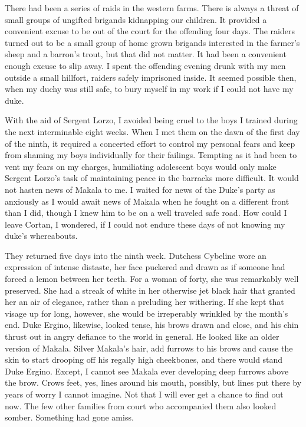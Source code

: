 \documentclass{article}
\begin{document}
There had been a series of raids in the western farms. There is always a threat of small groups of ungifted brigands kidnapping  our children. It provided a convenient excuse to be out of the court for the offending four days. The raiders turned out to be a small group of home grown brigands interested in the farmer's sheep and a barron's trout, but that did not matter. It had been a convenient enough excuse to slip away. I spent the offending evening drunk with my men outside a small hillfort, raiders safely imprisoned inside. It seemed possible then, when my duchy was still safe, to bury myself in my work if I could not have my duke. 

With the aid of Sergent Lorzo, I avoided being cruel to the boys I trained during the next interminable eight weeks. When I met them on the dawn of the first day of the ninth, it required a concerted effort to control my personal fears and keep from shaming my boys individually for their failings. Tempting as it had been to vent my fears on my charges, humiliating adolescent boys would only make Sergent Lorzo's task of maintaining peace in the barracks more difficult. It would not hasten news of Makala to me. I waited for news of the Duke's party as anxiously as I would await news of Makala when he fought on a different front than I did, though I knew him to be on a well traveled safe road. How could I leave Cortan, I wondered, if I could not endure these days of not knowing my duke's whereabouts.

They returned five days into the ninth week. Dutchess Cybeline wore an expression of intense distaste, her face puckered and drawn as if someone had forced a lemon between her teeth. For a woman of forty, she was remarkably well preserved. She had a streak of white in her otherwise jet black hair that granted her an air of elegance, rather than a preluding her withering. If she kept that visage up for long, however, she would be irreperably wrinkled by the month's end. Duke Ergino, likewise, looked tense, his brows drawn and close, and his chin thrust out in angry defiance to the world in general. He looked like an older version of Makala. Silver Makala's hair, add furrows to his brows and cause the skin to start drooping off his regally high cheekbones, and there would stand Duke Ergino. Except, I cannot see Makala ever developing deep furrows above the brow. Crows feet, yes, lines around his mouth, possibly, but lines put there by years of worry I cannot imagine. Not that I will ever get a chance to find out now. The few other families from court who accompanied them also looked somber. Something had gone amiss. 
\end{document}
